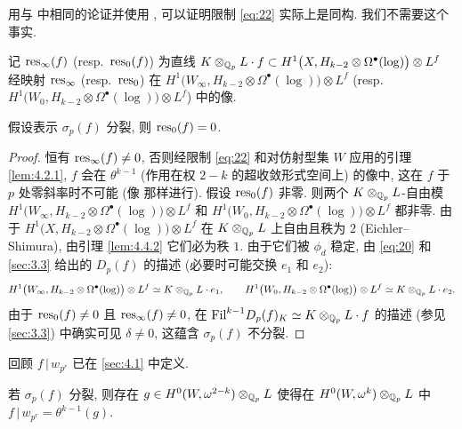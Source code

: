 \begin{remark}\label{rem:4.4.5}
用与 \cite[\S8]{ref:13} 中相同的论证并使用 \cite{ref:2}, 可以证明限制 \eqref{eq:22} 实际上是同构.
我们不需要这个事实.
\end{remark}

记 $\operatorname{res}_{\infty}(f)$ (resp.\ $\operatorname{res}_0(f)$) 为直线 $K \otimes_{\mathbb{Q}_p} L \cdot f \subset H^{1}\bigl(X,H_{k-2} \otimes \Omega^{\bullet}(\log)\bigr) \otimes L^{f}$ 经映射 $\operatorname{res}_{\infty}$ (resp.\ $\operatorname{res}_0$) 在 $H^{1}\bigl(W_{\infty},H_{k-2} \otimes \Omega^{\bullet}(\log)\bigr) \otimes L^{f}$ (resp.\ $H^{1}\bigl(W_0,H_{k-2} \otimes \Omega^{\bullet}(\log)\bigr) \otimes L^{f}$) 中的像.

\begin{proposition}\label{prop:4.4.6}
假设表示 $\sigma_p(f)$ 分裂, 则 $\operatorname{res}_0(f) = 0$.
\end{proposition}

\begin{proof}
恒有 $\operatorname{res}_{\infty}(f) \neq 0$, 否则经限制 \eqref{eq:22} 和对仿射型集 $W$ 应用的引理 \ref{lem:4.2.1}, $f$ 会在 $\theta^{k-1}$ (作用在权 $2-k$ 的超收敛形式空间上) 的像中, 这在 $f$ 于 $p$ 处零斜率时不可能 (像 \cite[Lem.~6.3]{ref:13} 那样进行).
假设 $\operatorname{res}_0(f)$ 非零.
则两个 $K \otimes_{\mathbb{Q}_p} L$-自由模 $H^{1}\bigl(W_{\infty},H_{k-2} \otimes \Omega^{\bullet}(\log)\bigr) \otimes L^{f}$ 和 $H^{1}\bigl(W_0,H_{k-2} \otimes \Omega^{\bullet}(\log)\bigr) \otimes L^{f}$ 都非零.
由于 $H^{1}\bigl(X,H_{k-2} \otimes \Omega^{\bullet}(\log)\bigr) \otimes L^{f}$ 在 $K \otimes_{\mathbb{Q}_p} L$ 上自由且秩为 $2$ (Eichler--Shimura), 由引理 \ref{lem:4.4.2} 它们必为秩 $1$.
由于它们被 $\phi_d$ 稳定, 由 \eqref{eq:20} 和 \ref{sec:3.3} 给出的 $D_p(f)$ 的描述 (必要时可能交换 $e_1$ 和 $e_2$):
\[
H^{1}\bigl(W_{\infty},H_{k-2} \otimes \Omega^{\bullet}(\log)\bigr) \otimes L^{f} \simeq K \otimes_{\mathbb{Q}_p} L \cdot e_1,
\qquad
H^{1}\bigl(W_0,H_{k-2} \otimes \Omega^{\bullet}(\log)\bigr) \otimes L^{f} \simeq K \otimes_{\mathbb{Q}_p} L \cdot e_2.
\]
由于 $\operatorname{res}_0(f) \neq 0$ 且 $\operatorname{res}_{\infty}(f) \neq 0$, 在 $\mathrm{Fil}^{k-1}D_p(f)_K \simeq K \otimes_{\mathbb{Q}_p} L \cdot f$ 的描述 (参见 \ref{sec:3.3}) 中确实可见 $\delta \neq 0$, 这蕴含 $\sigma_p(f)$ 不分裂.
\end{proof}

回顾 $f\,|\,w_{p^{r}}$ 已在 \ref{sec:4.1} 中定义.

\begin{proposition}\label{prop:4.4.7}
若 $\sigma_p(f)$ 分裂, 则存在 $g \in H^{0}(W,\omega^{2-k}) \otimes_{\mathbb{Q}_p} L$ 使得在 $H^{0}(W,\omega^{k}) \otimes_{\mathbb{Q}_p} L$ 中 $f\,|\,w_{p^{r}} = \theta^{k-1}(g)$.
\end{proposition}

